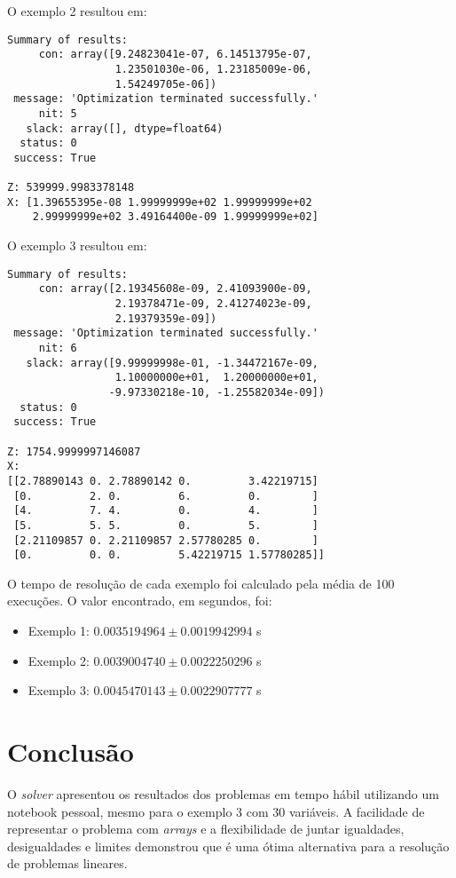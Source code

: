 \documentclass[conference,compsoc]{IEEEtran}
\begin{document}
O exemplo 2 resultou em:
\begin{lstlisting}
Summary of results:
     con: array([9.24823041e-07, 6.14513795e-07,
                 1.23501030e-06, 1.23185009e-06,
                 1.54249705e-06])
 message: 'Optimization terminated successfully.'
     nit: 5
   slack: array([], dtype=float64)
  status: 0
 success: True

Z: 539999.9983378148
X: [1.39655395e-08 1.99999999e+02 1.99999999e+02
    2.99999999e+02 3.49164400e-09 1.99999999e+02]
\end{lstlisting}

O exemplo 3 resultou em:
\begin{lstlisting}
Summary of results:
     con: array([2.19345608e-09, 2.41093900e-09,
                 2.19378471e-09, 2.41274023e-09,
                 2.19379359e-09])
 message: 'Optimization terminated successfully.'
     nit: 6
   slack: array([9.99999998e-01, -1.34472167e-09, 
                 1.10000000e+01,  1.20000000e+01,
                -9.97330218e-10, -1.25582034e-09])
  status: 0
 success: True

Z: 1754.9999997146087
X:     
[[2.78890143 0. 2.78890142 0.         3.42219715]
 [0.         2. 0.         6.         0.        ]
 [4.         7. 4.         0.         4.        ]
 [5.         5. 5.         0.         5.        ]
 [2.21109857 0. 2.21109857 2.57780285 0.        ]
 [0.         0. 0.         5.42219715 1.57780285]]
\end{lstlisting}

O tempo de resolução de cada exemplo foi calculado pela média de 100 execuções. O valor encontrado, em segundos, foi:
\begin{itemize}
\item Exemplo 1: $0.0035194964 \pm 0.0019942994$ s
\item Exemplo 2: $0.0039004740 \pm 0.0022250296$ s
\item Exemplo 3: $0.0045470143 \pm 0.0022907777$ s
\end{itemize}

\section{Conclusão} \label{sec_concl}

O \textit{solver} apresentou os resultados dos problemas em tempo hábil utilizando um notebook pessoal, mesmo para o exemplo 3 com 30 variáveis. A facilidade de representar o problema com \textit{arrays} e a flexibilidade de juntar igualdades, desigualdades e limites demonstrou que é uma ótima alternativa para a resolução de problemas lineares.



\end{document}
